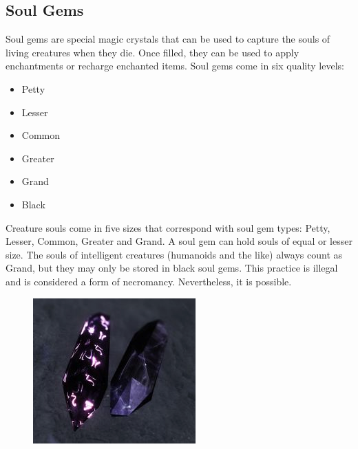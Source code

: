\documentclass[12pt]{book}
\begin{document}
\subsection{Soul Gems}

Soul gems are special magic crystals that can be used to capture the souls of living creatures when they die. Once filled, they can be used to apply enchantments or recharge enchanted items. Soul gems come in six quality levels:

\begin{itemize}
	\item Petty
	\item Lesser
	\item Common
	\item Greater
	\item Grand
	\item Black
\end{itemize}

Creature souls come in five sizes that correspond with soul gem types: Petty, Lesser, Common, Greater and Grand. A soul gem can hold souls of equal or lesser size. The souls of intelligent creatures (humanoids and the like) always count as Grand, but they may only be stored in black soul gems. This practice is illegal and is considered a form of necromancy. Nevertheless, it is possible.

\begin{figure}
	\includegraphics[width=\textwidth]{soulgem.png}
\end{figure}
\end{document}
